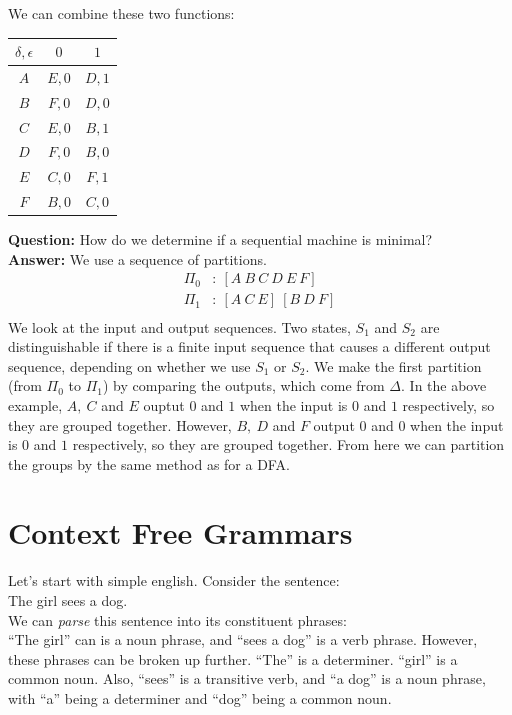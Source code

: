 \documentclass{scrartcl}
\begin{document}
We can combine these two functions:\\
\begin{center}
\begin{tabular} {|c|c c|}
\hline
$\delta,\epsilon$&$0$&$1$\\
\hline
$A$ & $E,0$ & $D,1$\\
$B$ & $F,0$ & $D,0$\\
$C$ & $E,0$ & $B,1$\\
$D$ & $F,0$ & $B,0$\\
$E$ & $C,0$ & $F,1$\\
$F$ & $B,0$ & $C,0$\\
\hline
\end{tabular}
\end{center}

\textbf{Question: } How do we determine if a sequential machine is minimal?\\

\textbf{Answer: } We use a sequence of partitions.
\begin{align*}
\Pi_0&:\ [A\ B\ C\ D\ E\ F]\\
\Pi_1&:\ [A\ C\ E]\ [B\ D\ F]\\
\end{align*}
We look at the input and output sequences. Two states, $S_1$ and $S_2$ are distinguishable if there is a finite input sequence that causes a different output sequence, depending on whether we use $S_1$ or $S_2$. We make the first partition (from $\Pi_0$ to $\Pi_1$) by comparing the outputs, which come from $\Delta$. In the above example, $A,\ C$ and $E$ ouptut $0$ and $1$ when the input is $0$ and $1$ respectively, so they are grouped together. However, $B,\ D$ and $F$ output $0$ and $0$ when the input is $0$ and $1$ respectively, so they are grouped together. From here we can partition the groups by the same method as for a DFA.\pagebreak

\section{Context Free Grammars}
Let's start with simple english. Consider the sentence:\\

The girl sees a dog.\\

We can \emph{parse} this sentence into its constituent phrases:\\
``The girl'' can is a noun phrase, and ``sees a dog'' is a verb phrase. However, these phrases can be broken up further. ``The'' is a determiner. ``girl'' is a common noun. Also, ``sees'' is a transitive verb, and ``a dog'' is a noun phrase, with ``a'' being a determiner and ``dog'' being a common noun.\\
\end{document}
